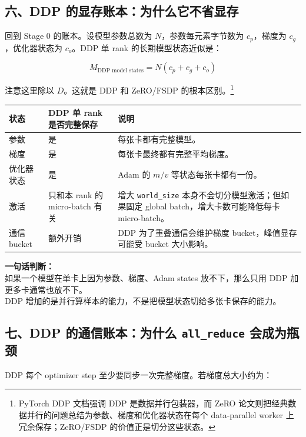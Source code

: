 \subsection{六、DDP 的显存账本：为什么它不省显存}

回到 Stage 0 的账本。设模型参数总数为 $N$，参数每元素字节数为 $c_p$，梯度为 $c_g$，优化器状态为 $c_o$。DDP 单 rank 的长期模型状态近似是：

\[
M_{\text{DDP model states}}
=
N(c_p + c_g + c_o)
\]

注意这里除以 $D$。这就是 DDP 和 ZeRO/FSDP 的根本区别。\footnote{PyTorch DDP 文档强调 DDP 是数据并行包装器，而 ZeRO 论文则把经典数据并行的问题总结为参数、梯度和优化器状态在每个 data-parallel worker 上冗余保存；ZeRO/FSDP 的价值正是切分这些状态。}

\begin{center}
{\small
\begin{tabular}{p{3cm}p{4.1cm}p{5.7cm}}
\hline
\textbf{状态} & \textbf{DDP 单 rank 是否完整保存} & \textbf{说明} \\
\hline
参数 & 是 & 每张卡都有完整模型。 \\
梯度 & 是 & 每张卡最终都有完整平均梯度。 \\
优化器状态 & 是 & Adam 的 $m/v$ 等状态每张卡都有一份。 \\
激活 & 只和本 rank 的 micro-batch 有关 & 增大 \texttt{world\_size} 本身不会切分模型激活；但如果固定 global batch，增大卡数可能降低每卡 micro-batch。 \\
通信 bucket & 额外开销 & DDP 为了重叠通信会维护梯度 bucket，峰值显存可能受 bucket 大小影响。 \\
\hline
\end{tabular}
}
\end{center}

\begin{warnbox}
\textbf{一句话判断：}\\
如果一个模型在单卡上因为参数、梯度、Adam states 放不下，那么只用 DDP 加更多卡通常也放不下。\\
DDP 增加的是并行算样本的能力，不是把模型状态切给多张卡保存的能力。
\end{warnbox}

\subsection{七、DDP 的通信账本：为什么 \texttt{all\_reduce} 会成为瓶颈}

DDP 每个 optimizer step 至少要同步一次完整梯度。若梯度总大小约为：

